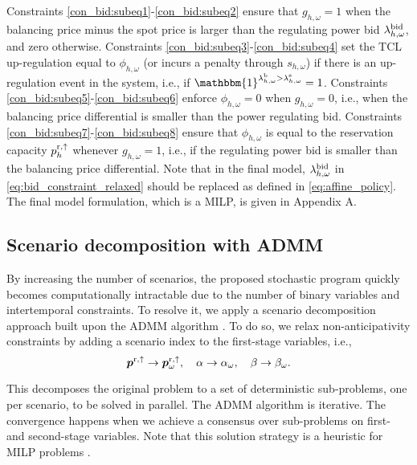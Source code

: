 Constraints \eqref{con_bid:subeq1}-\eqref{con_bid:subeq2} ensure that $g_{h,\omega} = 1$ when the balancing price minus the spot price is larger than the regulating power bid $\lambda^{\rm{bid}}_{h, \omega}$, and zero otherwise. Constraints \eqref{con_bid:subeq3}-\eqref{con_bid:subeq4} set the TCL up-regulation equal to $\phi_{h,\omega}$ (or incurs a penalty through $s_{h,\omega}$) if there is an up-regulation event in the system, i.e., if $\mathbbm{1}^{\lambda^{\rm{b}}_{h,\omega} > \lambda^{\rm{s}}_{h,\omega}} = 1$. Constraints \eqref{con_bid:subeq5}-\eqref{con_bid:subeq6} enforce  $\phi_{h,\omega} = 0$ when $g_{h,\omega} = 0$, i.e., when the balancing price differential is smaller than the power regulating bid. Constraints \eqref{con_bid:subeq7}-\eqref{con_bid:subeq8} ensure that $\phi_{h,\omega}$ is equal to the reservation capacity $p^{\rm{r},\uparrow}_{h}$ whenever $g_{h,\omega} = 1$, i.e., if the regulating power bid is smaller than the balancing price differential. Note that in the final model,  $\lambda^{\rm{bid}}_{h, \omega}$ in \eqref{eq:bid_constraint_relaxed} should be replaced as defined in \eqref{eq:affine_policy}. The final model formulation, which is a MILP, is given in Appendix A.

\vspace{-1mm}
\subsection{Scenario decomposition with ADMM}
By increasing the number of scenarios,  the proposed stochastic program  quickly becomes computationally intractable due to the number of binary variables and intertemporal constraints. To resolve it, we apply a scenario decomposition approach built upon the ADMM algorithm \cite{boyd2011distributed}. To do so, we relax non-anticipativity constraints by adding a scenario index to the first-stage variables, i.e.,
%
\begin{equation}\label{eq:non_anticipativity}
    \bm{p}^{\rm{r},\uparrow} \rightarrow \bm{p}^{\rm{r},\uparrow}_{\omega}, \quad \alpha \rightarrow \alpha_{\omega}, \quad \beta \rightarrow \beta_{\omega}.
\end{equation}

This decomposes the original problem to a set of deterministic sub-problems, one per scenario, to be solved in parallel.
The ADMM algorithm is iterative. The convergence happens when we achieve a consensus over sub-problems on first- and second-stage  variables. Note that this solution strategy is a heuristic for MILP problems \cite{hong2016convergence}.
